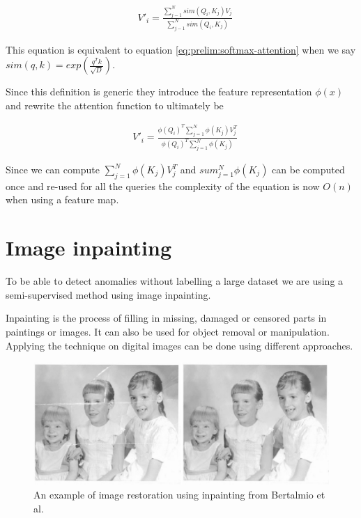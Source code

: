\begin{align}
&V'_i =\frac{\sum_{j-1} ^{N} sim(Q_i, K_j) V_j}{\sum_{j-1} ^{N} sim(Q_i, K_j)}
\end{align}

This equation is equivalent to equation \ref{eq:prelim:softmax-attention} when we say $sim(q, k) = exp(\frac{q^Tk}{\sqrt{D}})$.

Since this definition is generic they introduce the feature representation $\phi(x)$ and rewrite the attention function to ultimately be

\begin{align}
    &V'_i = \frac{\phi(Q_i)^T\sum_{j=1}^{N} \phi(K_j)V_j^T}{\phi(Q_i)^T\sum_{j=1}^{N} \phi(K_j)}
\end{align}

Since we can compute $\sum_{j=1}^{N} \phi(K_j)V_j^T$ and $sum_{j=1}^{N} \phi(K_j)$ can be computed once and re-used for all the queries the complexity of the equation is now $O(n)$ when using a feature map.

\section{Image inpainting}
\label{sec:prelim:image-inpainting}

To be able to detect anomalies without labelling a large dataset we are using a semi-supervised method using image inpainting.

Inpainting is the process of filling in missing, damaged or censored parts in paintings or images. It can also be used for object removal or manipulation.
Applying the technique on digital images can be done using different approaches.

\begin{figure}[ht!]
\centering
\includegraphics[width=\textwidth]{imgs/inpainting-example.jpeg}
\caption{An example of image restoration using inpainting from Bertalmio et al. \cite{bertalmio_image_2000}}
\label{fig:prelim:inpainting-example}
\end{figure}


